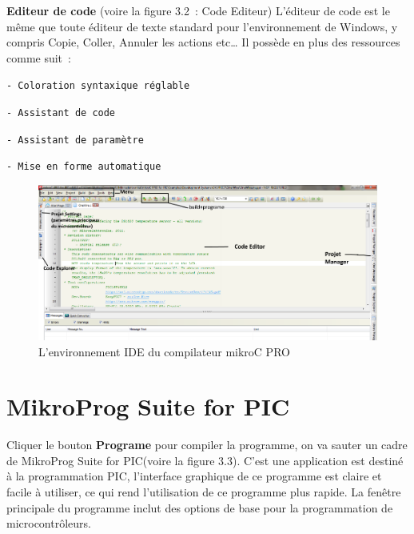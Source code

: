\documentclass[a4paper, 12pt]{book}
\newcounter{program}[subsection]
\begin{document}
\textbf{Editeur de code} (voire la figure 3.2~: Code Editeur)
L’éditeur de code est le même que toute éditeur de texte standard pour l’environnement de 
Windows, y compris Copie, Coller, Annuler les actions etc… Il possède en plus des ressources comme suit~: 
\begin{description}
\item \texttt{- Coloration syntaxique réglable}
\item \texttt{- Assistant de code}
\item \texttt{- Assistant de paramètre}
\item \texttt{- Mise en forme automatique}
\end{description}
\begin{figure}[htbp]
  \centering
  \includegraphics[width=1.0\linewidth]{images/mikroC_PRO_for_PIC.png}
  \caption{L'environnement IDE du compilateur mikroC PRO\label{fig-bmp}}
\end{figure}

\section{MikroProg Suite for PIC}
Cliquer le bouton \textbf{Programe} pour compiler la programme, on va sauter un cadre de MikroProg Suite for PIC(voire la figure 3.3). C’est une application est destiné à la programmation PIC, l'interface graphique de ce programme est claire et facile à utiliser, ce qui rend l’utilisation de ce programme plus rapide. La fenêtre principale du programme inclut des options de base pour la programmation de microcontrôleurs.\\
\end{document}
